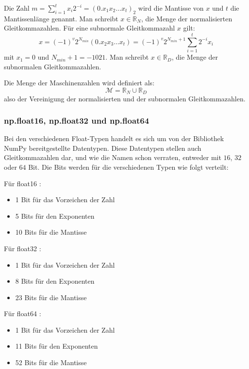 \documentclass{scrartcl}
\begin{document}
Die Zahl \( m = \sum_{i=1}^{t}x_i 2^{-i} = (0.x_1x_2\ldots x_t)_2 \) wird die
Mantisse von \( x \) und \( t \) die Mantissenlänge genannt.
Man schreibt \( x \in \mathbb{R}_N \), die Menge der normalisierten
Gleitkommazahlen.
Für eine subnormale Gleitkommazahl \( x \) gilt: \[ x = (-1)^v 2^{N_{min}}
    (0.x_2 x_3 \ldots x_t) = (-1)^v 2^{N_{min}+1} \sum_{i=1}^{t} 2^{-i} x_i \] mit
\( x_1 = 0 \) und \( N_{min} + 1 = -1021 \).
Man schreibt \( x \in \mathbb{R}_D \), die Menge der subnormalen
Gleitkommazahlen.

Die Menge der Maschinenzahlen wird definiert als: \[ \mathcal{M} = \mathbb{R}_N
    \cup \mathbb{R}_D \] also der Vereinigung der normalisierten und der
subnormalen Gleitkommazahlen.

\subsubsection{np.float16, np.float32 und np.float64}
Bei den verschiedenen Float-Typen handelt es sich um von der Bibliothek NumPy
bereitgestellte Datentypen.
Diese Datentypen stellen auch Gleitkommazahlen dar, und wie die Namen schon
verraten, entweder mit \( 16 \), \( 32 \) oder \( 64 \) Bit.
Die Bits werden für die verschiedenen Typen wie folgt verteilt:

Für float16 \cite{half-precision_floating-point_format}:
\begin{itemize}
    \item 1 Bit für das Vorzeichen der Zahl %
    \item 5 Bits für den Exponenten
    \item 10 Bits für die Mantisse
\end{itemize}

Für float32 \cite{single-precision_floating-point_format}:
\begin{itemize}
    \item 1 Bit für das Vorzeichen der Zahl %
    \item 8 Bits für den Exponenten
    \item 23 Bits für die Mantisse
\end{itemize}

Für float64 \cite{double-precision_floating-point_format}:
\begin{itemize}
    \item 1 Bit für das Vorzeichen der Zahl
    \item 11 Bits für den Exponenten
    \item 52 Bits für die Mantisse
\end{itemize}
\end{document}
